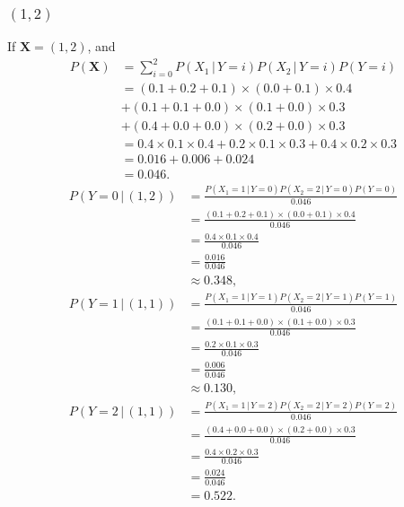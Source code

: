 \documentclass[10pt]{article}
\begin{document}
\subsubsection*{$(1, 2)$}
If $\textbf{X} = (1, 2)$, and
\begin{align*}
P(\textbf{X}) &= \sum_{i = 0}^2 P(X_1 \, | \, Y = i)P(X_2 \, | \, Y = i)P(Y = i) \\
             &= (0.1 + 0.2 + 0.1) \times (0.0 + 0.1) \times 0.4 \\
             &+ (0.1 + 0.1 + 0.0) \times (0.1 + 0.0) \times 0.3 \\
             &+ (0.4 + 0.0 + 0.0) \times (0.2 + 0.0) \times 0.3 \\
             &= 0.4 \times 0.1 \times 0.4 + 0.2 \times 0.1 \times 0.3 + 0.4 \times 0.2 \times 0.3 \\
			 &=  0.016 + 0.006 +0.024 \\
			 &= 0.046.
\end{align*}
\begin{align*}
P(Y = 0 \, | \, (1, 2)) &= \frac{P(X_1= 1 \, | \, Y = 0)P(X_2 = 2 \, | \, Y = 0)P(Y = 0)}{ 0.046 } \\
     &= \frac{ (0.1 + 0.2 + 0.1) \times (0.0 + 0.1) \times 0.4 }{ 0.046 } \\
     &= \frac{ 0.4 \times 0.1 \times 0.4 }{ 0.046 } \\
     &= \frac{ 0.016 }{ 0.046 } \\
     &\approx 0.348,
\end{align*}
\begin{align*}
P(Y = 1 \, | \, (1, 1)) &= \frac{ P(X_1 = 1 \, | \, Y = 1)P(X_2 = 2 \, | \,  Y = 1)P(Y = 1)}{ 0.046 } \\
     &= \frac{ (0.1 + 0.1 + 0.0) \times (0.1 + 0.0) \times 0.3 }{ 0.046 } \\
     &= \frac{ 0.2 \times 0.1 \times 0.3 }{ 0.046 } \\
     &= \frac{ 0.006 }{ 0.046 } \\
     &\approx 0.130,
\end{align*}
\begin{align*}
P(Y = 2 \, | \, (1, 1)) &= \frac{ P(X_1 = 1 \, | \, Y = 2)P(X_2 = 2 \, | \, Y = 2)P(Y = 2) }{ 0.046 } \\
     &= \frac{ (0.4 + 0.0 + 0.0) \times (0.2 + 0.0) \times 0.3 }{ 0.046 } \\
     &= \frac{ 0.4 \times 0.2 \times 0.3}{ 0.046 } \\
     &= \frac{ 0.024 }{ 0.046 } \\
     &= 0.522.
\end{align*}
\end{document}
